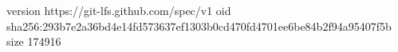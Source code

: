 version https://git-lfs.github.com/spec/v1
oid sha256:293b7e2a36bd4e14fd573637ef1303b0cd470fd4701ee6be84b2f94a95407f5b
size 174916
